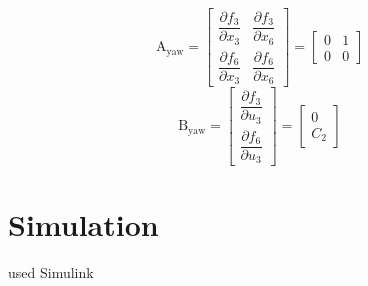 \documentclass[conference]{IEEEtran}
\begin{document}
\begin{equation}
	\boldsymbol{\mathrm{A}}_{\text{yaw}} = \begin{bmatrix}
		\dfrac{\partial  f_3}{\partial  x_3}& \dfrac{\partial  f_3}{\partial  x_6}
		\\[1em]
		\dfrac{\partial  f_6}{\partial  x_3}& \dfrac{\partial  f_6}{\partial  x_6}
	\end{bmatrix} = 
	\begin{bmatrix}
		0 & 1\\
		0 & 0
	\end{bmatrix}
\end{equation}
\begin{equation}
	\boldsymbol{\mathrm{B}}_{\text{yaw}} = \begin{bmatrix}
		\dfrac{\partial  f_3}{\partial  u_3}
		\\[1em]
		\dfrac{\partial  f_6}{\partial  u_3}
	\end{bmatrix} = 
	\begin{bmatrix}
		0\\
		C_2
	\end{bmatrix}
\end{equation}


\section{Simulation}
used Simulink
\end{document}
